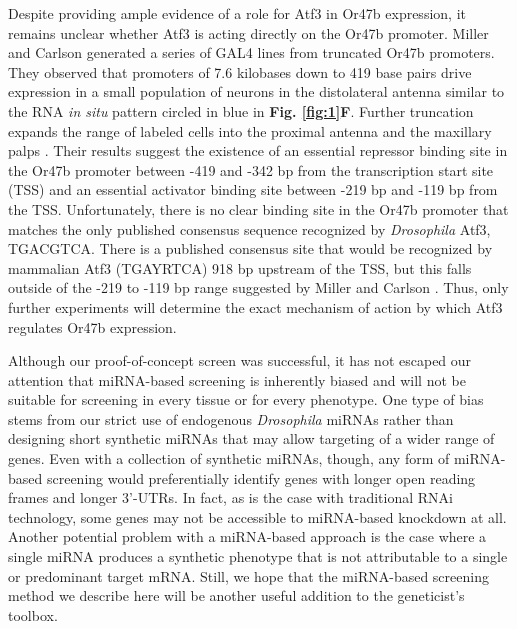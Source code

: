 Despite providing ample evidence of a role for Atf3 in Or47b expression, it remains unclear whether Atf3 is acting directly on the Or47b promoter.
Miller and Carlson generated a series of GAL4 lines from truncated Or47b promoters.
They observed that promoters of 7.6 kilobases down to 419 base pairs drive expression in a small population of neurons in the distolateral antenna similar to the RNA \emph{in situ} pattern circled in blue in \textbf{Fig. \ref{fig:1}F}.
Further truncation expands the range of labeled cells into the proximal antenna and the maxillary palps \cite{Miller_Carlson_2010}.
Their results suggest the existence of an essential repressor binding site in the Or47b promoter between -419 and -342 bp from the transcription start site (TSS) and an essential activator binding site between -219 bp and -119 bp from the TSS.
Unfortunately, there is no clear binding site in the Or47b promoter that matches the only published \cite{a_Bohmann_Jindra_Uhlirova_2009} consensus sequence recognized by \emph{Drosophila} Atf3, TGACGTCA.
There is a published \cite{Brodesser_Jindra_Uhlirova_2012} consensus site that would be recognized by mammalian Atf3 (TGAYRTCA) 918 bp upstream of the TSS, but this falls outside of the -219 to -119 bp range suggested by Miller and Carlson \cite{Miller_Carlson_2010}.
Thus, only further experiments will determine the exact mechanism of action by which Atf3 regulates Or47b expression.

Although our proof-of-concept screen was successful, it has not escaped our attention that miRNA-based screening is inherently biased and will not be suitable for screening in every tissue or for every phenotype.
One type of bias stems from our strict use of endogenous \emph{Drosophila} miRNAs rather than designing short synthetic miRNAs that may allow targeting of a wider range of genes.
Even with a collection of synthetic miRNAs, though, any form of miRNA-based screening would preferentially identify genes with longer open reading frames and longer 3'-UTRs.
In fact, as is the case with traditional RNAi technology, some genes may not be accessible to miRNA-based knockdown at all.
Another potential problem with a miRNA-based approach is the case where a single miRNA produces a synthetic phenotype that is not attributable to a single or predominant target mRNA.
Still, we hope that the miRNA-based screening method we describe here will be another useful addition to the geneticist's toolbox.